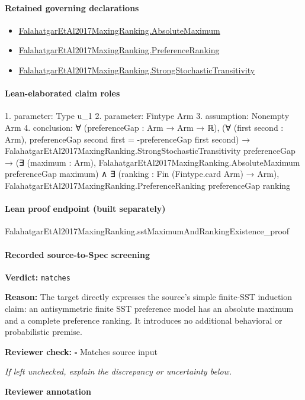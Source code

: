 \documentclass[10pt]{article}
\newcommand{\reviewerbox}{%
  \par\noindent\fbox{\parbox{0.96\linewidth}{\rule{0pt}{0.38in}}}\par
}
\newcommand{\reviewmatch}[1]{%
  \par\noindent\textbf{Reviewer check:} $\square$\; #1\par
  \noindent\emph{If left unchecked, explain the discrepancy or uncertainty below.}\par
}
\begin{document}
\paragraph{Retained governing declarations}
\begin{itemize}\raggedright
\item \hyperlink{paper-prerequisite-9c0d6111ba7505a4}{Falahatgar\allowbreak{}Et\allowbreak{}Al2017\allowbreak{}Maxing\allowbreak{}Ranking.\allowbreak{}Absolute\allowbreak{}Maximum}
\item \hyperlink{paper-prerequisite-b4c336afe891bbfe}{Falahatgar\allowbreak{}Et\allowbreak{}Al2017\allowbreak{}Maxing\allowbreak{}Ranking.\allowbreak{}Preference\allowbreak{}Ranking}
\item \hyperlink{paper-prerequisite-76807884cf8ad345}{Falahatgar\allowbreak{}Et\allowbreak{}Al2017\allowbreak{}Maxing\allowbreak{}Ranking.\allowbreak{}Strong\allowbreak{}Stochastic\allowbreak{}Transitivity}
\end{itemize}
\paragraph{Lean-elaborated claim roles}\begin{ReviewVerbatim}
1. parameter: Type u_1
2. parameter: Fintype Arm
3. assumption: Nonempty Arm
4. conclusion: ∀ (preferenceGap : Arm → Arm → ℝ),
  (∀ (first second : Arm), preferenceGap second first = -preferenceGap first second) →
    FalahatgarEtAl2017MaxingRanking.StrongStochasticTransitivity preferenceGap →
      (∃ (maximum : Arm), FalahatgarEtAl2017MaxingRanking.AbsoluteMaximum preferenceGap maximum) ∧
        ∃ (ranking : Fin (Fintype.card Arm) → Arm),
          FalahatgarEtAl2017MaxingRanking.PreferenceRanking preferenceGap ranking
\end{ReviewVerbatim}

\paragraph{Lean proof endpoint (built separately)}\begin{ReviewVerbatim}
FalahatgarEtAl2017MaxingRanking.sstMaximumAndRankingExistence_proof
\end{ReviewVerbatim}

\paragraph{Recorded source-to-Spec screening}
\textbf{Verdict:} \texttt{matches}
\\
{\raggedright
\textbf{Reason:} The target directly expresses the source's simple finite-\allowbreak{}SST induction claim:\allowbreak{} an antisymmetric finite SST preference model has an absolute maximum and a complete preference ranking.\allowbreak{} It introduces no additional behavioral or probabilistic premise.\allowbreak{}
\par}
\reviewmatch{Matches source input}
\noindent\textbf{Reviewer annotation}\par
\reviewerbox
\end{document}
